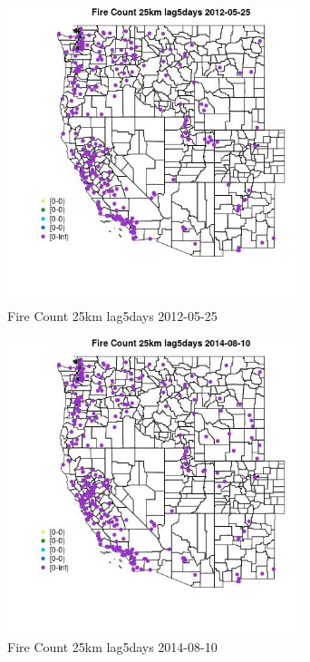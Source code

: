 \begin{figure} 
\centering  
\includegraphics[width=0.77\textwidth]{Code_Outputs/Report_ML_input_PM25_Step4_part_e_de_duplicated_aves_compiled_2019-05-18wNAs_MapObsFire_Count_25km_lag5days2012-05-25.jpg} 
\caption{\label{fig:Report_ML_input_PM25_Step4_part_e_de_duplicated_aves_compiled_2019-05-18wNAsMapObsFire_Count_25km_lag5days2012-05-25}Fire Count 25km lag5days 2012-05-25} 
\end{figure} 
 

\begin{figure} 
\centering  
\includegraphics[width=0.77\textwidth]{Code_Outputs/Report_ML_input_PM25_Step4_part_e_de_duplicated_aves_compiled_2019-05-18wNAs_MapObsFire_Count_25km_lag5days2014-08-10.jpg} 
\caption{\label{fig:Report_ML_input_PM25_Step4_part_e_de_duplicated_aves_compiled_2019-05-18wNAsMapObsFire_Count_25km_lag5days2014-08-10}Fire Count 25km lag5days 2014-08-10} 
\end{figure} 
 

